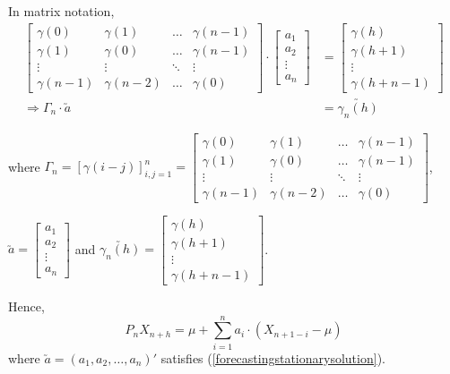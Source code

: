 \documentclass[11pt, a4paper]{article}
\numberwithin{equation}{section}
\theoremstyle{definition}
\begin{document}
In matrix notation,
\begin{align}
\begin{bmatrix}
\gamma(0) & \gamma(1) & \ldots & \gamma(n-1)\\
\gamma(1) & \gamma(0) & \ldots & \gamma(n-1)\\
\vdots & \vdots & \ddots & \vdots \\
\gamma(n-1) & \gamma(n-2) & \ldots & \gamma(0)
\end{bmatrix}
\cdot
\begin{bmatrix}
a_1 \\ a_2 \\ \vdots \\ a_n
\end{bmatrix}
&=
\begin{bmatrix}
\gamma(h) \\ \gamma(h+1) \\ \vdots \\ \gamma(h+n-1)
\end{bmatrix} \label{forecastingmatrixequation} \\[0.5em]
\Rightarrow \Gamma_n \cdot \utilde{a} &= \utilde{\gamma_n(h)} \label{forecastingstationarysolution}
\end{align}

where $\Gamma_n = \left[ \gamma(i-j) \right]_{i, j = 1}^{n} = \begin{bmatrix}
\gamma(0) & \gamma(1) & \ldots & \gamma(n-1)\\
\gamma(1) & \gamma(0) & \ldots & \gamma(n-1)\\
\vdots & \vdots & \ddots & \vdots \\
\gamma(n-1) & \gamma(n-2) & \ldots & \gamma(0)
\end{bmatrix}$, \\[0.25em]
\begin{center}
$\utilde{a} = \begin{bmatrix}
a_1 \\ a_2 \\ \vdots \\ a_n
\end{bmatrix}$ and $\utilde{\gamma_n(h)} = \begin{bmatrix}
\gamma(h) \\ \gamma(h+1) \\ \vdots \\ \gamma(h+n-1)
\end{bmatrix}$.
\end{center}

Hence,
\begin{equation}\label{forecastingstationarypredictionequation}
P_n X_{n+h} = \mu + \sum \limits_{i = 1}^{n} a_i \cdot \left( X_{n+1-i} - \mu \right)
\end{equation}
where $\utilde{a} = \left( a_1, a_2, \ldots, a_n \right)'$ satisfies (\ref{forecastingstationarysolution}). \\[0.1em]
\end{document}

